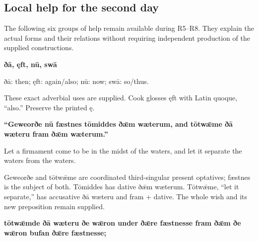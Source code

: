 \subsection*{Local help for the second day}

The following six groups of help remain available during R5–R8. They explain the actual forms and their relations without requiring independent production of the supplied constructions.

\textbf{ðā, ęft, nū, swā}

ðā: then; ęft: again/\allowbreak{}also; nū: now; swā: so/\allowbreak{}thus.

These exact adverbial uses are supplied. Cook glosses ęft with Latin quoque, “also.” Preserve the printed ę.

\textbf{“Geweorðe nū fæstnes tōmiddes ðǣm wæterum, and tōtwǣme ðā wæteru fram ðǣm wæterum.”}

Let a firmament come to be in the midst of the waters, and let it separate the waters from the waters.

Geweorðe and tōtwǣme are coordinated third-singular present optatives; fæstnes is the subject of both. Tōmiddes has dative ðǣm wæterum. Tōtwǣme, “let it separate,” has accusative ðā wæteru and fram + dative. The whole wish and its new preposition remain supplied.

\textbf{tōtwǣmde ðā wæteru ðe wǣron under ðǣre fæstnesse fram ðǣm ðe wǣron bufan ðǣre fæstnesse;}

